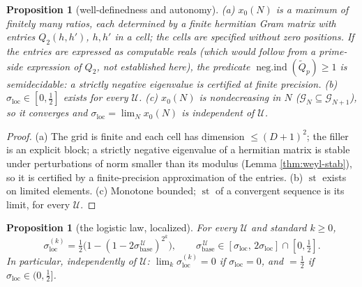\documentclass[11pt,reqno]{amsart}
\newtheorem{proposition}[theorem]{Proposition}
\theoremstyle{definition}
\newcommand{\negind}{\operatorname{neg.ind}}
\newcommand{\sst}{\operatorname{st}}
\newcommand{\half}{\tfrac12}
\begin{document}
\begin{proposition}[well-definedness and autonomy]\label{prop:loc-welldef}
\textup{(a)} \(x_0(N)\) is a maximum of finitely many ratios, each determined by
a finite hermitian Gram matrix with entries \(Q_2(h,h')\), \(h,h'\) in a cell;
the cells are specified without zero positions. If the entries are expressed as
computable reals (which would follow from a prime-side expression of \(Q_2\),
not established here), the predicate \(\negind(\tilde Q_p)\geq1\) is
semidecidable: a strictly negative eigenvalue is certified at finite precision.
\textup{(b)} \(\sigma_{\mathrm{loc}}\in[0,\tfrac12]\) exists for every
\(\mathcal U\). \textup{(c)} \(x_0(N)\) is nondecreasing in \(N\)
(\(\mathcal G_N\subseteq\mathcal G_{N+1}\)), so it converges and
\(\sigma_{\mathrm{loc}}=\lim_N x_0(N)\) is independent of \(\mathcal U\).
\end{proposition}

\begin{proof}
(a) The grid is finite and each cell has dimension \(\leq(D+1)^2\); the filler
is an explicit block; a strictly negative eigenvalue of a hermitian matrix is
stable under perturbations of norm smaller than its modulus (Lemma
\ref{thm:weyl-stab}), so it is certified by a finite-precision approximation of
the entries. (b) \(\sst\) exists on limited elements. (c) Monotone bounded;
\(\sst\) of a convergent sequence is its limit, for every \(\mathcal U\).
\end{proof}

\begin{proposition}[the logistic law, localized]
\label{prop:loc-logistic}
For every \(\mathcal U\) and standard \(k\geq0\),
\[
\sigma_{\mathrm{loc}}^{(k)}
=\half\bigl(1-(1-2\sigma_{\mathrm{base}}^{\,\mathcal U})^{2^k}\bigr),
\qquad
\sigma_{\mathrm{base}}^{\,\mathcal U}\in
[\sigma_{\mathrm{loc}},\,2\sigma_{\mathrm{loc}}]\cap[0,\tfrac12].
\]
In particular, \emph{independently of \(\mathcal U\)}:
\(\lim_k\sigma_{\mathrm{loc}}^{(k)}=0\) if \(\sigma_{\mathrm{loc}}=0\), and
\(=\half\) if \(\sigma_{\mathrm{loc}}\in(0,\tfrac12]\).
\end{proposition}
\end{document}
